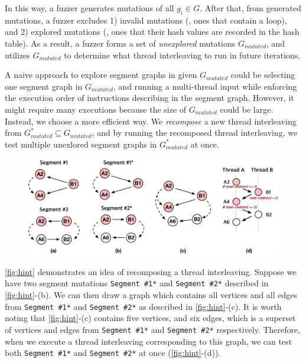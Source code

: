 In this way, a fuzzer generates mutations of all $g_i \in G$. After
that, from generated mutations, a fuzzer excludes 1) invalid mutations
(\ie, ones that contain a loop), and 2) explored mutations (\ie, ones
that their hash values are recorded in the hash table).
%
As a result, a fuzzer forms a set of \textit{unexplored} mutations
$G_{mutated}$, and utilizes $G_{mutated}$ to determine what thread
interleaving to run in future iterations.





%
A naive approach to explore segment graphs in given $G_{mutated}$
could be selecting one segment graph in $G_{mutated}$, and running a
multi-thread input while enforcing the execution order of instructions
describing in the segment graph.
%
However, it might require many executions because the size of
$G_{mutated}$ could be large.
%
Instead, we choose a more efficient way. We \textit{recompose} a new
thread interleaving from $G^*_{mutated} \subseteq G_{mutated}$, and by running
the recomposed thread interleaving, we test multiple unexlored
segment graphs in $G^*_{mutated}$ at once.


\begin{figure}[t]
  \centering
  \includegraphics[width=\linewidth]{fig/hint.pdf}
  \caption{}
  \label{fig:hint}
\end{figure}



\autoref{fig:hint} demonstrates an idea of recomposing a thread
interleaving. Suppose we have two segment mutations \texttt{Segment
  \#1*} and \texttt{Segment \#2*} described in \autoref{fig:hint}-(b).
%
We can then draw a graph which contains all vertices and all edges
from \texttt{Segment \#1*} and \texttt{Segment \#2*} as described in
\autoref{fig:hint}-(c).
%
It is worth noting that \autoref{fig:hint}-(c) contains five vertices,
and six edges, which is a superset of vertices and edges from
\texttt{Segment \#1*} and \texttt{Segment \#2*} respectively.
%
Therefore, when we execute a thread interleaving corresponding to this
graph, we can test both \texttt{Segment \#1*} and \texttt{Segment
  \#2*} at once (\autoref{fig:hint}-(d)).



